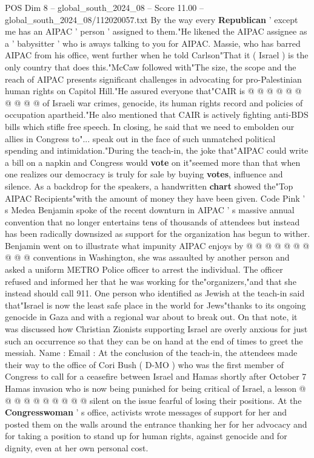 \begin{textsample}{POS Dim 8 – global\_south\_2024\_08 – Score 11.00 – global\_south\_2024\_08/112020057.txt}
By the way every \textbf{Republican} ' except me has an AIPAC ' person ' assigned to them."He likened the AIPAC assignee as a ' babysitter ' who is aways talking to you for AIPAC.
Massie, who has barred AIPAC from his office, went further when he told Carlson"That it ( Israel ) is the only country that does this."McCaw followed with"The size, the scope and the reach of AIPAC presents significant challenges in advocating for pro-Palestinian human rights on Capitol Hill."He assured everyone that"CAIR is @ @ @ @ @ @ @ @ @ @ of Israeli war crimes, genocide, its human rights record and policies of occupation apartheid."He also mentioned that CAIR is actively fighting anti-BDS bills which stifle free speech.
In closing, he said that we need to embolden our allies in Congress to"... speak out in the face of such unmatched political spending and intimidation."During the teach-in, the joke that"AIPAC could write a bill on a napkin and Congress would \textbf{vote} on it"seemed more than that when one realizes our democracy is truly for sale by buying \textbf{votes}, influence and silence.
As a backdrop for the speakers, a handwritten \textbf{chart} showed the"Top AIPAC Recipients"with the amount of money they have been given.
Code Pink ' s Medea Benjamin spoke of the recent downturn in AIPAC ' s massive annual convention that no longer entertains tens of thousands of attendees but instead has been radically downsized as support for the organization has begun to wither.
Benjamin went on to illustrate what impunity AIPAC enjoys by @ @ @ @ @ @ @ @ @ @ conventions in Washington, she was assaulted by another person and asked a uniform METRO Police officer to arrest the individual.
The officer refused and informed her that he was working for the"organizers,"and that she instead should call 911.
One person who identified as Jewish at the teach-in said that"Israel is now the least safe place in the world for Jews"thanks to its ongoing genocide in Gaza and with a regional war about to break out.
On that note, it was discussed how Christian Zionists supporting Israel are overly anxious for just such an occurrence so that they can be on hand at the end of times to greet the messiah.
Name : Email : At the conclusion of the teach-in, the attendees made their way to the office of Cori Bush ( D-MO ) who was the first member of Congress to call for a ceasefire between Israel and Hamas shortly after October 7 Hamas invasion who is now being punished for being critical of Israel, a lesson @ @ @ @ @ @ @ @ @ @ silent on the issue fearful of losing their positions.
At the \textbf{Congresswoman} ' s office, activists wrote messages of support for her and posted them on the walls around the entrance thanking her for her advocacy and for taking a position to stand up for human rights, against genocide and for dignity, even at her own personal cost.

\end{textsample}
